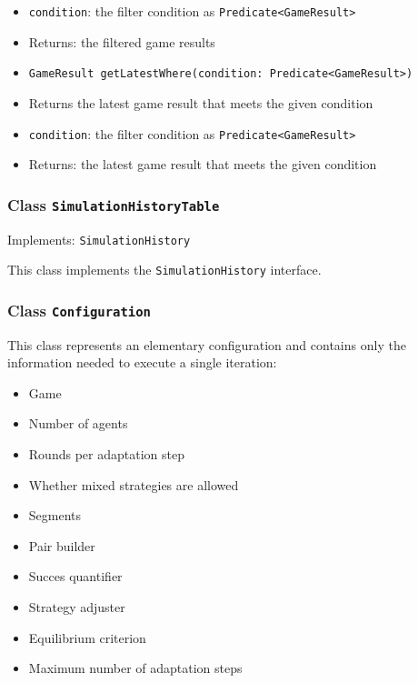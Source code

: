 \documentclass[parskip=full,11pt]{scrartcl}
\begin{document}
\begin{itemize}
	\item[]\texttt{condition}: the filter condition as \texttt{Predicate<GameResult>}
	\item[]Returns: the filtered game results
	\item \texttt{GameResult getLatestWhere(condition: Predicate<GameResult>)}
	\item[] Returns the latest game result that meets the given condition
	\item[]\texttt{condition}: the filter condition as \texttt{Predicate<GameResult>}
	\item[]Returns: the latest game result that meets the given condition
\end{itemize}

\subsubsection{Class \texttt{SimulationHistoryTable}}
Implements: \texttt{SimulationHistory}

This  class implements the \texttt{SimulationHistory} interface.

\subsubsection{Class \texttt{Configuration}}
This class represents an elementary configuration and contains only the information needed to execute a single iteration:
\begin{itemize}\itemsep -10pt
\item Game
\item Number of agents
\item Rounds per adaptation step
\item Whether mixed strategies are allowed
\item Segments
\item Pair builder
\item Succes quantifier
\item Strategy adjuster
\item Equilibrium criterion
\item Maximum number of adaptation steps
\end{itemize}
\end{document}
